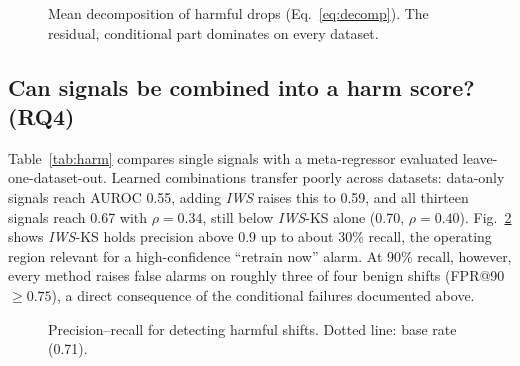 \documentclass[conference]{IEEEtran}
\theoremstyle{plainhead}
\newcommand{\iws}{\textit{IWS}}
\newcommand{\pp}{\,pp\xspace}
\begin{document}
\begin{figure}[t]
\centering

\caption{Mean decomposition of harmful drops (Eq.~\ref{eq:decomp}). The residual, conditional part dominates on every dataset.}
\label{fig:decomp}
\end{figure}

\begin{table}[t]
\centering
\caption{Decomposition per dataset. Evals = pairs$\times$models$\times$seeds; $\bar\Delta_\text{harm}$ = mean drop of harmful evaluations (pp); $Y|X$ share = residual share of mean absolute drop; $|\pi_T-\pi_S|$ = mean change in positive rate.}
\label{tab:decomp}
\footnotesize
\setlength{\tabcolsep}{3.5pt}

\end{table}

\subsection{Can signals be combined into a harm score? (RQ4)}
Table~\ref{tab:harm} compares single signals with a meta-regressor evaluated leave-one-dataset-out. Learned combinations transfer poorly across datasets: data-only signals reach AUROC 0.55, adding \iws{} raises this to 0.59, and all thirteen signals reach 0.67 with $\rho=0.34$, still below \iws{}-KS alone (0.70, $\rho=0.40$). Fig.~\ref{fig:pr} shows \iws{}-KS holds precision above 0.9 up to about 30\% recall, the operating region relevant for a high-confidence ``retrain now'' alarm. At 90\% recall, however, every method raises false alarms on roughly three of four benign shifts (FPR@90 $\ge0.75$), a direct consequence of the conditional failures documented above.

\begin{table}[t]
\centering
\caption{Harm detection: single signals vs.\ a meta-regressor trained leave-one-dataset-out ($\Delta>2$\pp).}
\label{tab:harm}
\footnotesize
\setlength{\tabcolsep}{4pt}

\end{table}

\begin{figure}[t]
\centering

\caption{Precision--recall for detecting harmful shifts. Dotted line: base rate (0.71).}
\label{fig:pr}
\end{figure}
\end{document}
